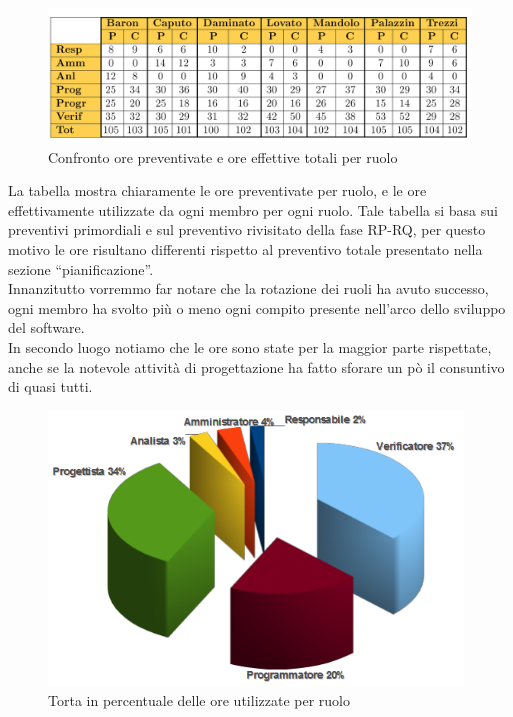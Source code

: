 \vspace{0cm}
\begin{figure}[htbp!]
  \centering
  \includegraphics[width=15cm, angle=0]{img/PP/Prev-Cons-Finale.png}
\caption{Confronto ore preventivate e ore effettive totali per ruolo}
\end{figure}
\vspace{0.5cm}

La tabella mostra chiaramente le ore preventivate per ruolo, e le ore
effettivamente utilizzate da ogni membro per ogni ruolo. Tale
tabella si basa sui preventivi primordiali e sul preventivo rivisitato della
fase RP-RQ, per questo motivo le ore risultano differenti rispetto al preventivo
totale presentato nella sezione ``pianificazione''. \\
Innanzitutto vorremmo far notare che la
rotazione dei ruoli ha avuto successo, ogni membro ha svolto pi\`u o meno 
ogni compito presente nell'arco dello sviluppo del software.\\ 
In secondo luogo notiamo che le ore sono state per la maggior parte rispettate, 
anche se la notevole attivit\`a di progettazione ha fatto sforare un p\`o il 
consuntivo di quasi tutti.\\

\newpage
\vspace{0cm}
\begin{figure}[htbp!]
  \centering
  \includegraphics[width=11cm, angle=0]{img/PP/ORERUOLI-FINE.png}
\caption{Torta in percentuale delle ore utilizzate per ruolo}
\end{figure}
\vspace{0.5cm}

